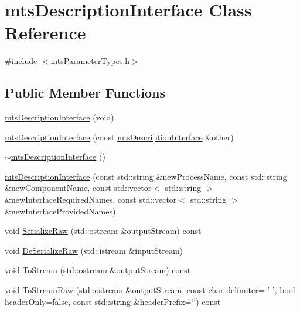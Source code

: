 \hypertarget{classmts_description_interface}{\section{mts\-Description\-Interface Class Reference}
\label{classmts_description_interface}
}


{\ttfamily \#include $<$mts\-Parameter\-Types.\-h$>$}

\subsection*{Public Member Functions}
\begin{DoxyCompactItemize}
\item 
\hyperlink{classmts_description_interface_ae4a67d275887332e608bdc9b102c46a9}{mts\-Description\-Interface} (void)
\item 
\hyperlink{classmts_description_interface_a5f4792933faa2eb276b2a6464eea2e92}{mts\-Description\-Interface} (const \hyperlink{classmts_description_interface}{mts\-Description\-Interface} \&other)
\item 
\hyperlink{classmts_description_interface_a931dae8a283c689a6c0211aee58d0654}{$\sim$mts\-Description\-Interface} ()
\item 
\hyperlink{classmts_description_interface_a95fccf272e167823ea539844eb2ea0e0}{mts\-Description\-Interface} (const std\-::string \&new\-Process\-Name, const std\-::string \&new\-Component\-Name, const std\-::vector$<$ std\-::string $>$ \&new\-Interface\-Required\-Names, const std\-::vector$<$ std\-::string $>$ \&new\-Interface\-Provided\-Names)
\item 
void \hyperlink{classmts_description_interface_ac3c31284ba77cd2e81295fe985909e3e}{Serialize\-Raw} (std\-::ostream \&output\-Stream) const 
\item 
void \hyperlink{classmts_description_interface_a73e47d634d5de6c0963fb5ce2cd70577}{De\-Serialize\-Raw} (std\-::istream \&input\-Stream)
\item 
void \hyperlink{classmts_description_interface_a6ac57169fc191987e0b6ece45379c6af}{To\-Stream} (std\-::ostream \&output\-Stream) const 
\item 
void \hyperlink{classmts_description_interface_a7b6c091d3a3f83c67e205118230b1355}{To\-Stream\-Raw} (std\-::ostream \&output\-Stream, const char delimiter= ' ', bool header\-Only=false, const std\-::string \&header\-Prefix=\char`\"{}\char`\"{}) const 
\item 

\end{DoxyCompactItemize}
